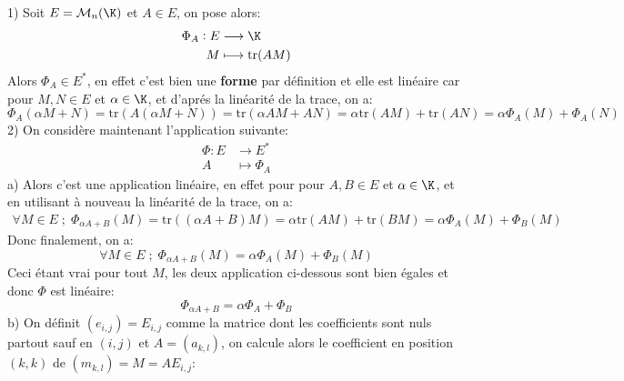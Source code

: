 \documentclass{report}
\begin{document}
   \chapter*{}

   \subsection*{}

   \subsection*{}
   1) Soit \(E = \mathcal{M}_n(\K)\) et \(A \in E\), on pose alors:
   \[
      \begin{aligned}
         \Phi_A : E &\longrightarrow \K\\
         M &\longmapsto \text{tr}(AM)
      \end{aligned}
   \]
   Alors \(\Phi_A \in E^*\), en effet c'est bien une \textbf{forme} par définition et elle est linéaire car pour \(M, N \in E\) et \(\alpha \in \K\), et d'aprés la linéarité de la trace, on a:
   \[
      \Phi_A(\alpha M + N) = \text{tr}(A(\alpha M + N)) = \text{tr}(\alpha AM + AN) = \alpha\text{tr}(AM) + \text{tr}(AN) = \alpha\Phi_A(M) + \Phi_A(N)
   \]
   2) On considère maintenant l'application suivante:
   \[
      \begin{aligned}
         \Phi : E &\longrightarrow E^*\\
         A &\longmapsto \Phi_A
      \end{aligned} 
   \]
   a) Alors c'est une application linéaire, en effet pour pour \(A, B \in E\) et \(\alpha \in \K\), et en utilisant à nouveau la linéarité de la trace, on a:
   \begin{align*}
      \forall M \in E \; ; \;  \Phi_{\alpha A + B}(M) = \text{tr}((\alpha A + B)M) = \alpha \text{tr}(AM) + \text{tr}(BM) = \alpha\Phi_A(M) + \Phi_B(M)
   \end{align*}
   Donc finalement, on a:
   \[
      \forall M \in E \; ; \; \Phi_{\alpha A + B}(M) = \alpha\Phi_A(M) + \Phi_B(M)
   \]
   Ceci étant vrai pour tout \(M\), les deux application ci-dessous sont bien égales et donc \(\Phi\) est linéaire:
   \[
      \Phi_{\alpha A + B} = \alpha\Phi_A + \Phi_B
   \]
   b) On définit \((e_{i, j}) = E_{i, j}\) comme la matrice dont les coefficients sont nuls partout sauf en \((i, j)\) et \(A = (a_{k, l})\), on calcule alors le coefficient en position \((k, k)\) de \((m_{k, l}) = M = AE_{i, j}\):
\end{document}
